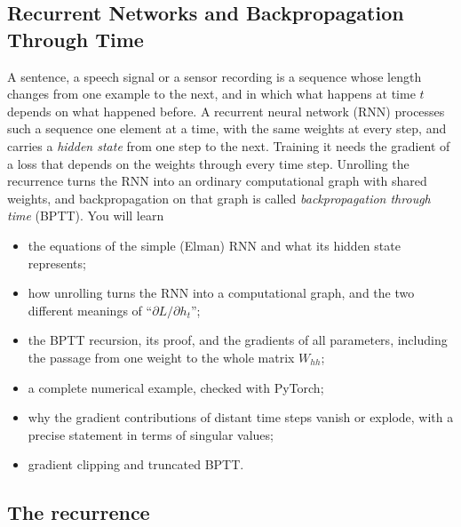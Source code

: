 \begin{notechapter}
\chapter{Recurrent Networks and Backpropagation Through Time}\label{ch:rnn-bptt}

\begin{chapterintro}
A sentence, a speech signal or a sensor recording is a sequence whose length changes from
one example to the next, and in which what happens at time $t$ depends on what happened
before. A recurrent neural network (RNN) processes such a sequence one element at a time,
with the same weights at every step, and carries a \emph{hidden state} from one step to
the next. Training it needs the gradient of a loss that depends on the weights through
every time step. Unrolling the recurrence turns the RNN into an ordinary computational
graph with shared weights, and backpropagation on that graph is called
\emph{backpropagation through time} (BPTT). You will learn
\begin{itemize}[nosep]
  \item the equations of the simple (Elman) RNN and what its hidden state represents;
  \item how unrolling turns the RNN into a computational graph, and the two different
        meanings of ``$\partial L/\partial h_t$'';
  \item the BPTT recursion, its proof, and the gradients of all parameters, including the
        passage from one weight to the whole matrix $W_{hh}$;
  \item a complete numerical example, checked with PyTorch;
  \item why the gradient contributions of distant time steps vanish or explode, with a
        precise statement in terms of singular values;
  \item gradient clipping and truncated BPTT.
\end{itemize}
\end{chapterintro}

\section{The recurrence}\label{rnn-bptt:sec:recurrence}


\end{notechapter}
